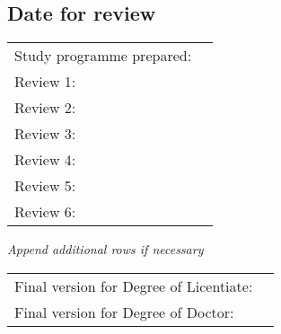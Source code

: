 \subsection{Date for review}
\begin{tabular}{p{11cm}p{4cm}}
Study programme prepared: & \cellcolor[gray]{0.95}                     \\
Review 1:                 & \cellcolor[gray]{0.95}                     \\
Review 2:                 & \cellcolor[gray]{0.95}                     \\
Review 3:                 & \cellcolor[gray]{0.95}                     \\
Review 4:                 & \cellcolor[gray]{0.95}                     \\
Review 5:                 & \cellcolor[gray]{0.95}                     \\
Review 6:                 & \cellcolor[gray]{0.95}                     \\
\end{tabular}

\textit{Append additional rows if necessary}

\vspace*{\baselineskip}
\begin{tabular}{p{11cm}p{4cm}}
Final version for Degree of Licentiate: & \cellcolor[gray]{0.95}                     \\
Final version for Degree of Doctor:     & \cellcolor[gray]{0.95}                     \\
\end{tabular}

